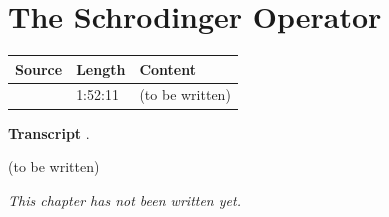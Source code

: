 \chapter{The Schrodinger Operator}\label{ch:c39}
\begin{paracol}{2}

\begin{sources}
\begin{tabularx}{\linewidth}{@{}l l L@{}}
\toprule
\textbf{Source} & \textbf{Length} & \textbf{Content}\\
\midrule
{} & 1:52:11 & (to be written)\\
\bottomrule
\end{tabularx}

\smallskip
\textbf{Transcript} .
\end{sources}

\begin{reading}
(to be written)
\end{reading}

\emph{This chapter has not been written yet.}

\flushside
\end{paracol}
